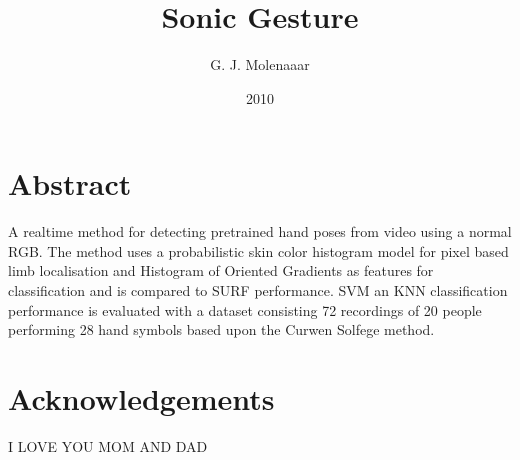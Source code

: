 \documentclass[a4paper]{book}
\begin{document}
\title{Sonic Gesture}
\author{G. J. Molenaaar}
\date{2010}

\maketitle{}

\newpage{}

\chapter*{Abstract}
A real\-time method for detecting pre\-trained hand poses from
video using a normal RGB. The method uses a probabilistic skin color histogram model for pixel based limb localisation and Histogram of Oriented Gradients as features for classification and is compared to SURF performance. SVM an KNN classification performance is evaluated with a dataset consisting 72 recordings of 20 people performing 28 hand symbols based upon the Curwen Solfege method. 

\tableofcontents{}
\listoffigures{}
\listoftables{}

\chapter*{Acknowledgements}
I LOVE YOU MOM AND DAD
















\end{document}
